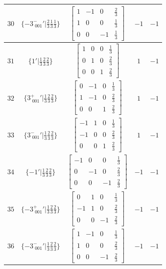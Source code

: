 \documentclass[fleqn,8pt]{jsarticle}
\begin{document}
\begin{longtable}{ccccc}
$ 30 $ & $ \{-3^{-}_{\,\,001}{}'|\frac{2}{3} \frac{1}{3} \frac{1}{3}\} $ & $ \begin{bmatrix} 1 & -1 & 0 & \frac{2}{3} \\ 1 & 0 & 0 & \frac{1}{3} \\ 0 & 0 & -1 & \frac{1}{3} \end{bmatrix} $ & $ -1 $ & $ -1 $ \\ \hline
$ 31 $ & $ \{1{}'|\frac{1}{3} \frac{2}{3} \frac{2}{3}\} $ & $ \begin{bmatrix} 1 & 0 & 0 & \frac{1}{3} \\ 0 & 1 & 0 & \frac{2}{3} \\ 0 & 0 & 1 & \frac{2}{3} \end{bmatrix} $ & $ 1 $ & $ -1 $ \\ \hline
$ 32 $ & $ \{3^{+}_{\,\,001}{}'|\frac{1}{3} \frac{2}{3} \frac{2}{3}\} $ & $ \begin{bmatrix} 0 & -1 & 0 & \frac{1}{3} \\ 1 & -1 & 0 & \frac{2}{3} \\ 0 & 0 & 1 & \frac{2}{3} \end{bmatrix} $ & $ 1 $ & $ -1 $ \\ \hline
$ 33 $ & $ \{3^{-}_{\,\,001}{}'|\frac{1}{3} \frac{2}{3} \frac{2}{3}\} $ & $ \begin{bmatrix} -1 & 1 & 0 & \frac{1}{3} \\ -1 & 0 & 0 & \frac{2}{3} \\ 0 & 0 & 1 & \frac{2}{3} \end{bmatrix} $ & $ 1 $ & $ -1 $ \\ \hline
$ 34 $ & $ \{-1{}'|\frac{1}{3} \frac{2}{3} \frac{2}{3}\} $ & $ \begin{bmatrix} -1 & 0 & 0 & \frac{1}{3} \\ 0 & -1 & 0 & \frac{2}{3} \\ 0 & 0 & -1 & \frac{2}{3} \end{bmatrix} $ & $ -1 $ & $ -1 $ \\ \hline
$ 35 $ & $ \{-3^{+}_{\,\,001}{}'|\frac{1}{3} \frac{2}{3} \frac{2}{3}\} $ & $ \begin{bmatrix} 0 & 1 & 0 & \frac{1}{3} \\ -1 & 1 & 0 & \frac{2}{3} \\ 0 & 0 & -1 & \frac{2}{3} \end{bmatrix} $ & $ -1 $ & $ -1 $ \\ \hline
$ 36 $ & $ \{-3^{-}_{\,\,001}{}'|\frac{1}{3} \frac{2}{3} \frac{2}{3}\} $ & $ \begin{bmatrix} 1 & -1 & 0 & \frac{1}{3} \\ 1 & 0 & 0 & \frac{2}{3} \\ 0 & 0 & -1 & \frac{2}{3} \end{bmatrix} $ & $ -1 $ & $ -1 $ \\
\end{longtable}
\end{document}
